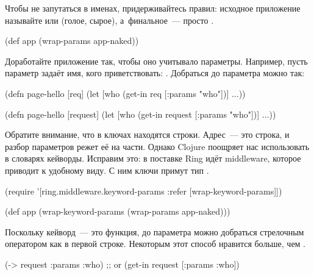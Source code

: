 \fi

Чтобы не запутаться в именах, придерживайтесь правил: исходное приложение
называйте  или  (голое, сырое), а~финальное~---
просто .

\begin{clojure}
(def app (wrap-params app-naked))
\end{clojure}

Доработайте приложение так, чтобы оно учитывало параметры. Например, пусть
параметр  задаёт имя, кого приветствовать:
. Добраться до параметра можно так:

\ifnarrow

\begin{clojure}
(defn page-hello [req]
  (let [who (get-in req [:params "who"])]
    ...))
\end{clojure}

\else

\begin{clojure}
(defn page-hello [request]
  (let [who (get-in request [:params "who"])]
    ...))
\end{clojure}

\fi


Обратите внимание, что в ключах  находятся строки. Адрес~--- это
строка, и разбор параметров режет её на части. Однако Clojure поощряет нас
использовать в словарях кейворды. Исправим это: в поставке Ring идёт middleware,
которое приводит  к удобному виду. С ним ключи примут тип
.


\begin{clojure}
(require '[ring.middleware.keyword-params
           :refer [wrap-keyword-params]])

(def app (wrap-keyword-params
           (wrap-params app-naked)))
\end{clojure}


Поскольку кейворд~--- это функция, до параметра можно добраться стрелочным
оператором как в первой строке. Некоторым этот способ нравится больше, чем
.

\begin{clojure}
(-> request :params :who)
;; or
(get-in request [:params :who])
\end{clojure}

